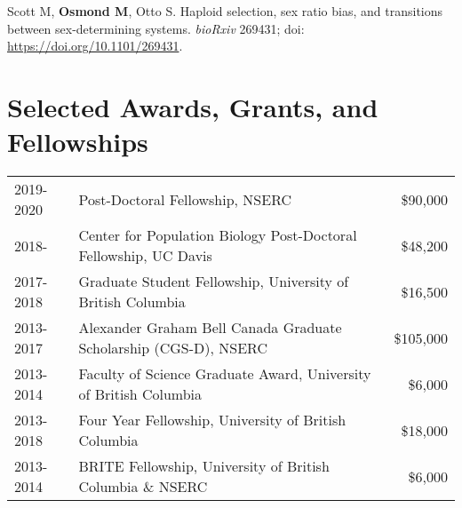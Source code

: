 \documentclass[12pt]{article}
\begin{document}
\noindent\hspace{.1cm}Scott M, \textbf{Osmond M}, Otto S. Haploid selection, sex ratio bias, and transitions between sex-determining systems. \textit{bioRxiv} 269431; doi: \href{https://www.biorxiv.org/content/early/2018/02/22/269431}{https://doi.org/10.1101/269431}.


\section*{Selected Awards, Grants, and Fellowships}

\begin{tabular}{llr}
  2019-2020 & Post-Doctoral Fellowship, NSERC & \$90,000 \\
  2018- & Center for Population Biology Post-Doctoral Fellowship, UC Davis & \$48,200 \\
  2017-2018 & Graduate Student Fellowship, University of British Columbia & \$16,500 \\
  2013-2017 & Alexander Graham Bell Canada Graduate Scholarship (CGS-D), NSERC & \$105,000\\
  2013-2014 & Faculty of Science Graduate Award, University of British Columbia & \$6,000\\
  2013-2018 & Four Year Fellowship, University of British Columbia & \$18,000\\
  2013-2014 & BRITE Fellowship, University of British Columbia \& NSERC & \$6,000\\

\end{tabular}
\end{document}
